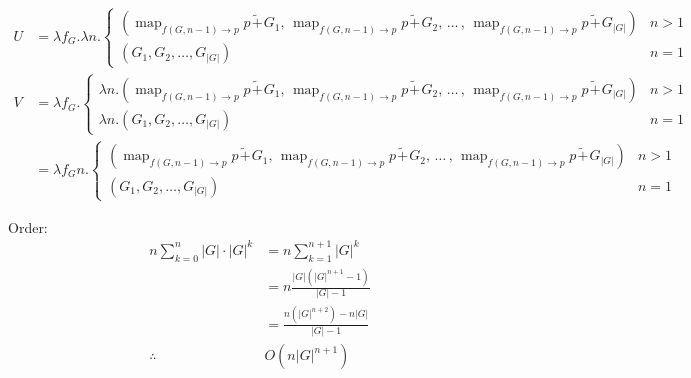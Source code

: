 \documentclass[uplatex,a4paper,dvipdfmx]{jsarticle}
\DeclareMathOperator*{\map}{map}
\newcommand{\append}{\hspace{1pt} \tilde{+} \hspace{1pt}}
\begin{document}
    \begin{align*}
        U &= \lambda f_G. \lambda n. \left\{
            \begin{array}{lc}
                \displaystyle \left( \map_{f(G,n-1) \to p} p \append G_1,\, \map_{f(G,n-1) \to p} p \append G_2,\, \ldots \,,\,\map_{f(G,n-1) \to p} p \append G_{\left| G \right|} \right) & n > 1 \\
                \left(G_1, G_2, \ldots, G_{\left| G \right|}\right) & n = 1
            \end{array}
            \right. \\
        V &= \lambda f_G. \left\{
            \begin{array}{lc}
                \lambda n.\displaystyle \left( \map_{f(G,n-1) \to p} p \append G_1,\, \map_{f(G,n-1) \to p} p \append G_2,\, \ldots \,,\,\map_{f(G,n-1) \to p} p \append G_{\left| G \right|} \right) & n > 1 \\
                \lambda n. \left(G_1, G_2, \ldots, G_{\left| G \right|}\right) & n = 1
            \end{array}
            \right. \\
            &= \lambda f_Gn. \left\{
            \begin{array}{lc}
                \displaystyle \left( \map_{f(G,n-1) \to p} p \append G_1,\, \map_{f(G,n-1) \to p} p \append G_2,\, \ldots \,,\,\map_{f(G,n-1) \to p} p \append G_{\left| G \right|} \right) & n > 1 \\
                \left(G_1, G_2, \ldots, G_{\left| G \right|}\right) & n = 1
            \end{array}
            \right.
    \end{align*}

    Order:
    \begin{align*}
        n \sum_{k=0}^{n} |G|\cdot|G|^k &= n \sum_{k=1}^{n+1} |G|^k \\
            &= n \frac{|G|(|G|^{n+1} - 1)}{|G|-1} \\
            &= \frac{n(|G|^{n+2}) - n|G|}{|G|-1} \\
        \therefore\hspace{5pt} &O(n|G|^{n+1})
    \end{align*}
\end{document}
